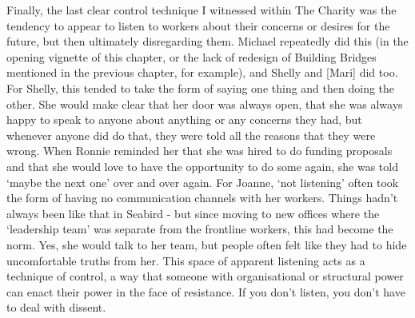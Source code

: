 Finally, the last clear control technique I witnessed within The Charity was the tendency to appear to listen to workers about their concerns or desires for the future, but then ultimately disregarding them. Michael repeatedly did this (in the opening vignette of this chapter, or the lack of redesign of Building Bridges mentioned in the previous chapter, for example), and Shelly and [Mari] did too. For Shelly, this tended to take the form of saying one thing and then doing the other. She would make clear that her door was always open, that she was always happy to speak to anyone about anything or any concerns they had, but whenever anyone did do that, they were told all the reasons that they were wrong. When Ronnie reminded her that she was hired to do funding proposals and that she would love to have the opportunity to do some again, she was told ‘maybe the next one’ over and over again. For Joanne, ‘not listening’ often took the form of having no communication channels with her workers. Things hadn’t always been like that in Seabird - but since moving to new offices where the ‘leadership team’ was separate from the frontline workers, this had become the norm. Yes, she would talk to her team, but people often felt like they had to hide uncomfortable truths from her. This space of apparent listening acts as a technique of control, a way that someone with organisational or structural power can enact their power in the face of resistance. If you don’t listen, you don’t have to deal with dissent.

